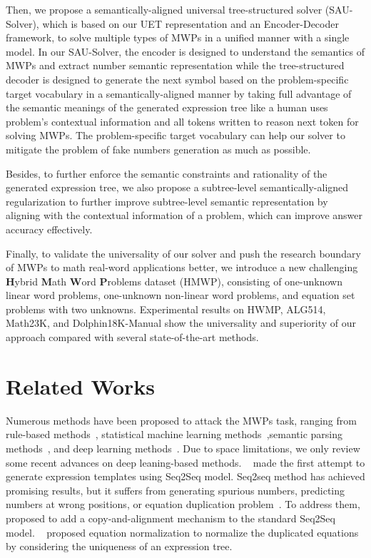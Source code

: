 \documentclass[11pt,a4paper]{article}
\begin{document}
Then, we propose a semantically-aligned universal tree-structured solver (SAU-Solver), which is based on our UET representation and an Encoder-Decoder framework, to solve multiple types of MWPs in a unified manner with a single model. In our SAU-Solver, the encoder is designed to understand the semantics of MWPs and extract number semantic representation while the tree-structured decoder is designed to generate the next symbol based on the problem-specific target vocabulary in a semantically-aligned manner by taking full advantage of the semantic meanings of the generated expression tree like a human uses problem's contextual information and all tokens written to reason next token for solving MWPs. The problem-specific target vocabulary can help our solver to mitigate the problem of fake numbers generation as much as possible.

Besides, to further enforce the semantic constraints and rationality of the generated expression tree, we also propose a subtree-level semantically-aligned regularization to further improve subtree-level semantic representation by aligning with the contextual information of a problem, which can improve answer accuracy effectively. 

Finally, to validate the universality of our solver and push the research boundary of MWPs to math real-word applications better, we introduce a new challenging \textbf{H}ybrid \textbf{M}ath \textbf{W}ord \textbf{P}roblems dataset (HMWP), consisting of one-unknown linear word problems, one-unknown non-linear word problems, and equation set problems with two unknowns. Experimental results on HWMP, ALG514, Math23K, and Dolphin18K-Manual show the universality and superiority of our approach compared with several state-of-the-art methods. 

\section{Related Works}
Numerous methods have been proposed to attack the MWPs task, ranging from rule-based methods~\cite{ bakman2007robust, yuhui2010frame-based}, statistical machine learning methods~\cite{kushman2014learning, zhou-etal-2015-learn, mitra-baral-2016-learning, huang-etal-2016-well, roy2018mapping},semantic parsing methods~\cite{shi-etal-2015-automatically,koncelkedziorski2015parsing,huang-etal-2017-learning}, and deep learning methods~\cite{ling-etal-2017-program, dns, mathdqn, cass, seq2et, seq2tree, trnn}. Due to space limitations, we only review some recent advances on deep leaning-based methods. ~\cite{dns} made the first attempt to generate expression templates using Seq2Seq model. Seq2seq method has achieved promising results, but it suffers from generating spurious numbers, predicting numbers at wrong positions, or equation duplication problem~\cite{cass, seq2et}. To address them,~\cite{cass} proposed to add a copy-and-alignment mechanism to the standard Seq2Seq model. ~\cite{seq2et} proposed equation normalization to normalize the duplicated equations by considering the uniqueness of an expression tree. 
\end{document}
